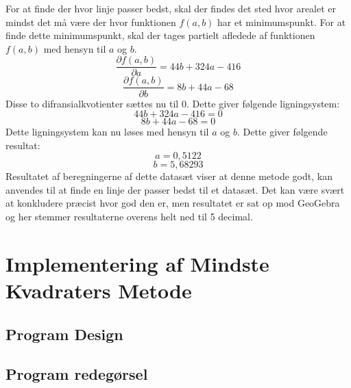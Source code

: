 For at finde der hvor linje passer bedst, skal der findes det sted hvor arealet er mindst det må være der hvor funktionen $f(a,b)$ har et minimumspunkt. For at finde dette minimumspunkt, skal der tages partielt afledede af funktionen $f(a,b)$ med hensyn til $a$ og $b$. 
\begin{equation*}
    \frac{\partial f(a,b)}{\partial a} = 44b + 324a - 416
\end{equation*}
\begin{equation*}
    \frac{\partial f(a,b)}{\partial b} = 8b + 44a - 68
\end{equation*}
Disse to difransialkvotienter sættes nu til 0. Dette giver følgende ligningsystem:
\begin{equation*}
    44b + 324a - 416 = 0
\end{equation*}
\begin{equation*}
    8b + 44a - 68 = 0
\end{equation*}
Dette ligningsystem kan nu løses med hensyn til $a$ og $b$. Dette giver følgende resultat:
\begin{equation*}
    a = 0,5122 
\end{equation*}
\begin{equation*}
    b = 5,68293
\end{equation*}
Resultatet af beregningerne af dette datasæt viser at denne metode godt, kan anvendes til at finde en linje der passer bedst til et datasæt. Det kan være svært at konkludere præcist hvor god den er, men resultatet er sat op mod GeoGebra og her stemmer resultaterne overens helt ned til 5 decimal.





\section{Implementering af Mindste Kvadraters Metode}


\subsection{Program Design}

\subsection{Program redegørsel}

